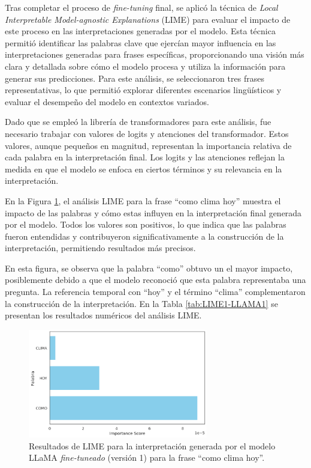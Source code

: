 Tras completar el proceso de \textit{fine-tuning} final, se aplicó la técnica de \textit{Local Interpretable Model-agnostic Explanations} (LIME) para evaluar el impacto de este proceso en las interpretaciones generadas por el modelo. Esta técnica permitió identificar las palabras clave que ejercían mayor influencia en las interpretaciones generadas para frases específicas, proporcionando una visión más clara y detallada sobre cómo el modelo procesa y utiliza la información para generar sus predicciones. Para este análisis, se seleccionaron tres frases representativas, lo que permitió explorar diferentes escenarios lingüísticos y evaluar el desempeño del modelo en contextos variados.

Dado que se empleó la librería de transformadores para este análisis, fue necesario trabajar con valores de logits y atenciones del transformador. Estos valores, aunque pequeños en magnitud, representan la importancia relativa de cada palabra en la interpretación final. Los logits y las atenciones reflejan la medida en que el modelo se enfoca en ciertos términos y su relevancia en la interpretación.

En la Figura \ref{fig:LIME1-LLAMA1}, el análisis LIME para la frase “como clima hoy” muestra el impacto de las palabras y cómo estas influyen en la interpretación final generada por el modelo. Todos los valores son positivos, lo que indica que las palabras fueron entendidas y contribuyeron significativamente a la construcción de la interpretación, permitiendo resultados más precisos.

En esta figura, se observa que la palabra “como” obtuvo un el mayor impacto, posiblemente debido a que el modelo reconoció que esta palabra representaba una pregunta. La referencia temporal con “hoy” y el término “clima” complementaron la construcción de la interpretación. En la Tabla \ref{tab:LIME1-LLAMA1} se presentan los resultados numéricos del análisis LIME.


\begin{figure}[H]
\centering
    \includegraphics[width=0.7\textwidth]{figuras/Oracion1.png}
    \caption{Resultados de LIME para la interpretación generada por el modelo LLaMA \textit{fine-tuneado} (versión 1) para la frase “como clima hoy”.}
    \label{fig:LIME1-LLAMA1}
\end{figure}


